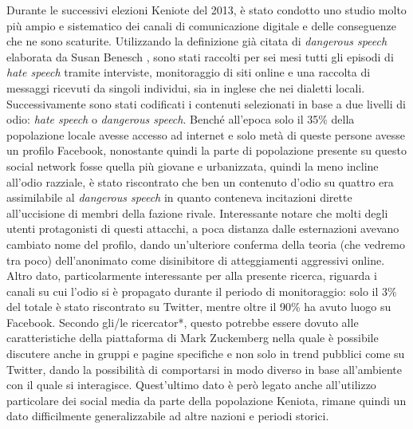 Durante le successivi elezioni Keniote del 2013, è stato condotto uno studio molto più ampio e sistematico dei canali di comunicazione digitale e delle conseguenze che ne sono scaturite. Utilizzando la definizione già citata di \textit{dangerous speech} elaborata da Susan Benesch \citep{benesch2012}, sono stati  raccolti per sei mesi tutti gli episodi di \textit{hate speech} tramite interviste, monitoraggio di siti online e una raccolta di messaggi ricevuti da singoli individui, sia in inglese che nei dialetti locali. Successivamente sono stati codificati i contenuti selezionati in base a due livelli di odio: \textit{hate speech} o \textit{dangerous speech}. Benché all'epoca solo il 35\% della popolazione locale avesse accesso ad internet e solo metà di queste persone avesse un profilo Facebook, nonostante quindi la parte di popolazione presente su questo social network fosse quella più giovane e urbanizzata, quindi la meno incline all'odio razziale, è stato riscontrato che ben un contenuto d'odio su quattro era assimilabile al \textit{dangerous speech} in quanto conteneva incitazioni dirette all'uccisione di membri della fazione rivale. Interessante notare che molti degli utenti protagonisti di questi attacchi, a poca distanza dalle esternazioni avevano cambiato nome del profilo, dando un'ulteriore conferma della teoria (che vedremo tra poco) dell'anonimato come disinibitore di atteggiamenti aggressivi online. Altro dato, particolarmente interessante per alla presente ricerca, riguarda i canali su cui l'odio si è propagato durante il periodo di monitoraggio: solo il 3\% del totale è stato riscontrato su Twitter, mentre oltre il 90\% ha avuto luogo su Facebook. Secondo gli/le ricercator*, questo potrebbe essere dovuto alle caratteristiche della piattaforma di Mark Zuckemberg nella quale è possibile discutere anche in gruppi e pagine specifiche e non solo in trend pubblici come su Twitter, dando la possibilità di comportarsi in modo diverso in base all'ambiente con il quale si interagisce. Quest'ultimo dato è però legato anche all'utilizzo particolare dei social media da parte della popolazione Keniota, rimane quindi un dato difficilmente generalizzabile ad altre nazioni e periodi storici.

